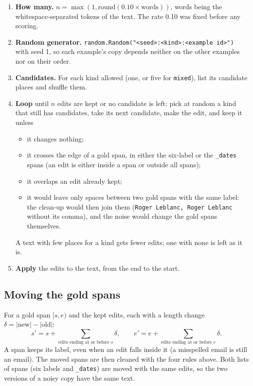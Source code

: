 \documentclass[10pt,a4paper]{article}
\newcommand{\file}[1]{\texttt{#1}}
\begin{document}
\begin{enumerate}
\item \textbf{How many.} $n = \max(1, \mathrm{round}(0.10 \times \text{words}))$, words being the
  whitespace-separated tokens of the text. The rate 0.10 was fixed before any scoring.
\item \textbf{Random generator.} \file{random.Random("<seed>:<kind>:<example id>")} with seed 1, so
  each example's copy depends neither on the other examples nor on their order.
\item \textbf{Candidates.} For each kind allowed (one, or five for \file{mixed}), list its candidate
  places and shuffle them.
\item \textbf{Loop} until $n$ edits are kept or no candidate is left: pick at random a kind that
  still has candidates, take its next candidate, make the edit, and keep it unless
  \begin{itemize}
  \item it changes nothing;
  \item it crosses the edge of a gold span, in either the six-label or the \file{\_dates} spans
    (an edit is either inside a span or outside all spans);
  \item it overlaps an edit already kept;
  \item it would leave only spaces between two gold spans with the same label: the clean-up
    would then join them (\file{Roger Leblanc, Roger Leblanc} without its comma), and the noise
    would change the gold spans themselves.
  \end{itemize}
  A text with few places for a kind gets fewer edits; one with none is left as it is.
\item \textbf{Apply} the edits to the text, from the end to the start.
\end{enumerate}

\subsection{Moving the gold spans}

For a gold span $[s, e)$ and the kept edits, each with a length change
$\delta = |\text{new}| - |\text{old}|$:
\[
s' = s + \sum_{\text{edits ending at or before } s} \delta, \qquad
e' = e + \sum_{\text{edits ending at or before } e} \delta .
\]
A span keeps its label, even when an edit falls inside it (a misspelled email is still an email).
The moved spans are then cleaned with the four rules above. Both lists of spans (six labels and
\file{\_dates}) are moved with the same edits, so the two versions of a noisy copy have the same
text.
\end{document}
